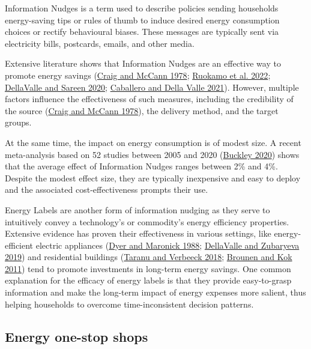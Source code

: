 \documentclass[
  11pt,
]{article}
\begin{document}
Information Nudges is a term used to describe policies sending
households energy-saving tips or rules of thumb to induce desired energy
consumption choices or rectify behavioural biases. These messages are
typically sent via electricity bills, postcards, emails, and other
media.

Extensive literature shows that Information Nudges are an effective way
to promote energy savings
(\protect\hyperlink{ref-craig1978assessing}{Craig and McCann 1978};
\protect\hyperlink{ref-ruokamo2022effect}{Ruokamo et al. 2022};
\protect\hyperlink{ref-dellavalle2020nudging}{DellaValle and Sareen
2020}; \protect\hyperlink{ref-caballero2021tackling}{Caballero and Della
Valle 2021}). However, multiple factors influence the effectiveness of
such measures, including the credibility of the source
(\protect\hyperlink{ref-craig1978assessing}{Craig and McCann 1978}), the
delivery method, and the target groups.

At the same time, the impact on energy consumption is of modest size. A
recent meta-analysis based on 52 studies between 2005 and 2020
(\protect\hyperlink{ref-buckley2020prices}{Buckley 2020}) shows that the
average effect of Information Nudges ranges between 2\% and 4\%. Despite
the modest effect size, they are typically inexpensive and easy to
deploy and the associated cost-effectiveness prompts their use.

Energy Labels are another form of information nudging as they serve to
intuitively convey a technology's or commodity's energy efficiency
properties. Extensive evidence has proven their effectiveness in various
settings, like energy-efficient electric appliances
(\protect\hyperlink{ref-dyer1988evaluation}{Dyer and Maronick 1988};
\protect\hyperlink{ref-dellavalle2019can}{DellaValle and Zubaryeva
2019}) and residential buildings
(\protect\hyperlink{ref-taranu2018closer}{Taranu and Verbeeck 2018};
\protect\hyperlink{ref-brounen2011economics}{Brounen and Kok 2011}) tend
to promote investments in long-term energy savings. One common
explanation for the efficacy of energy labels is that they provide
easy-to-grasp information and make the long-term impact of energy
expenses more salient, thus helping households to overcome
time-inconsistent decision patterns.

\hypertarget{energy-one-stop-shops}{%
\subsection{Energy one-stop shops}\label{energy-one-stop-shops}}
\end{document}
